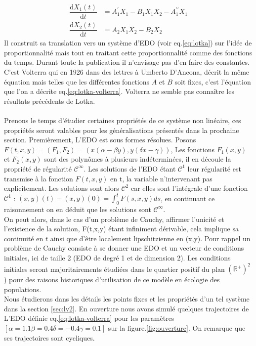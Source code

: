 \documentclass{wsdcr}
\begin{document}
\begin{equation}
\begin{aligned}
{\dfrac {\mathrm {d} X_1(t)}{\mathrm {d} t}}&=A_1^\prime X_1-B_1X_1X_2-A_1^{\prime \prime}X_1\\
{\dfrac {\mathrm {d} X_2(t)}{\mathrm {d} t}}&=A_2X_1X_2-B_2X_2
\end{aligned}
\label{eq:lotka}
\end{equation}
Il construit sa translation vers un système d'EDO (voir eq.\ref{eq:lotka}) sur l'idée de proportionnalité mais tout en traitant cette proportionnalité comme des fonctions du temps. Durant toute la publication il n'envisage pas d'en faire des constantes. C'est Volterra qui en 1926 dans des lettres à Umberto D'Ancona, décrit la même équation mais telles que les différentes fonctions $A$ et $B$ soit fixes, c'est l'équation que l'on a décrite eq.\ref{eq:lotka-volterra}. Volterra ne semble pas connaître les résultats précédents de Lotka. \cite{volterra1926} \\ \\
Prenons le temps d'étudier certaines propriétés de ce système non linéaire, ces propriétés seront valables pour les généralisations présentés dans la prochaine section. Premièrement, L'EDO est sous formes résolues. Posons $F(t,x,y)=(F_1,F_2)=(x(\alpha -\beta y),y(\delta x-\gamma ))$, Les fonctions $F_1(x,y)$ et $F_2(x,y)$ sont des polynômes à plusieurs indéterminées, il en découle la propriété de régularité $\mathcal{C}^\infty$. Les solutions de l'EDO étant $\mathcal{C}^1$ leur régularité est transmise à la fonction $F(t,x,y)$ en t, la variable n'intervenant pas explicitement. Les solutions sont alors $\mathcal{C}^2$ car elles sont l'intégrale d'une fonction $\mathcal{C}^1$ : $(x,y)(t)-(x,y)(0)=\int_0^t F(s,x,y)ds$, en continuant ce raisonnement on en déduit que les solutions sont $\mathcal{C}^\infty$. \\
On peut alors, dans le cas d'un problème de Cauchy, affirmer l'unicité et l'existence de la solution, F(t,x,y) étant infiniment dérivable, cela implique sa continuité en $t$ ainsi que d'être localement lipschitzienne en (x,y). Pour rappel un problème de Cauchy consiste à se donner une EDO et un vecteur de conditions initiales, ici de taille 2 (EDO de degré 1 et de dimension 2). Les conditions initiales seront majoritairements étudiées dans le quartier positif du plan $(\mathbb{R}^+)^2$) pour des raisons historiques d'utilisation de ce modèle en écologie des populations. \\
Nous étudierons dans les détails les points fixes et les propriétés d'un tel système dans la section \ref{sec:lv2}. En ouverture nous avons simulé quelques trajectoires de L'EDO définie eq.\ref{eq:lotka-volterra} pour les paramètres $[\alpha=1.1 \beta=0.4 \delta=-0.4 \gamma=0.1]$ sur la figure.\ref{fig:ouverture}. On remarque que ses trajectoires sont cycliques.
\end{document}
